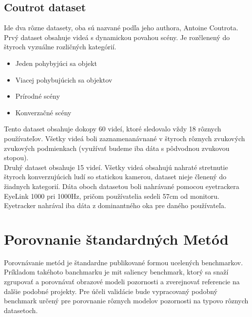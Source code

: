 \subsection{Coutrot dataset}
Ide dva rôzne datasety, oba sú nazvané podľa jeho authora, Antoine Coutrota.
Prvý dataset\cite{sound-1} obsahuje videá s dynamickou povahou scény.
Je rozčlenený do štyroch vyzuálne rozličných kategórií.
\begin{itemize}
  \item Jeden pohybyjúci sa objekt
  \item Viacej pohybujúcich sa objektov
  \item Prírodné scény
  \item Konverzačné scény
\end{itemize}
Tento dataset obsahuje dokopy 60 videí, ktoré sledovalo vždy 18 rôznych používateľov.
Všetky videá boli zaznamenanávnané v štyroch rôznych zvukových zvukových podmienkach (využívať budeme iba dáta s pôdvodnou zvukovou stopou). \\
Druhý dataset \cite{coutrot-database-2} obsahuje 15 videí.
Všetky videá obsahujú nahraté stretnutie štyroch konverzujúcich ludí so statickou kamerou, dataset nieje členený do žiadnych kategorií.
Dáta oboch datasetou boli nahrávané pomocou eyetrackera EyeLink 1000 pri 1000Hz, pričom používatelia sedeli 57cm od monitoru.
Eyetracker nahrával iba dáta z dominantného oka pre daného používateľa.

\section{Porovnanie štandardných Metód}
Porovnávanie metód je štandardne publikované formou ucelených benchmarkov.
Príkladom takéhoto banchmarku je mit saliency benchmark\cite{mit-saliency-benchmark}, ktorý sa snaží zgrupovať a porovnávať obrazové modeli pozornosti a zverejnovať referencie na dalšie podobné projekty.
Pre účeli validácie bude vypracovaný podobný benchmark určený pre porovnanie rôznych modelov pozornosti na typovo rôznych datasetoch.
